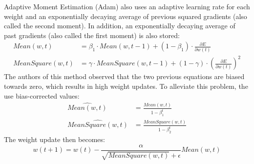 Adaptive Moment Estimation (Adam) \citep{DBLP:journals/corr/KingmaB14} also uses an adaptive learning rate for each weight and an exponentially decaying average of previous squared gradients (also called the second moment). In addition, an exponentially decaying average of past gradients (also called the first moment) is also stored:
\begin{subequations}
\label{eq:adam:means}
\begin{align}
    Mean(w,t) &= \beta_1 \cdot Mean(w,t-1) + (1-\beta_1)\cdot \frac{\partial E}{\partial w(t)}\\
    MeanSquare(w, t) &= \gamma \cdot MeanSquare(w, t-1) + (1 - \gamma) \cdot \left (\frac{\partial E}{\partial w(t)} \right )^2
\end{align}
\end{subequations}
The authors of this method observed that the two previous equations are biased towards zero, which results in high weight updates. To alleviate this problem, the use bias-corrected values:
\begin{subequations}
\label{eq:adam:means:corrected}
\begin{align}
    \widehat{Mean(w,t)} &= \frac{Mean(w,t)}{1-\beta_1^t}\\
    \widehat{MeanSquare(w,t)} &= \frac{MeanSquare(w,t)}{1-\beta_2^t}
\end{align}
\end{subequations}
The weight update then becomes:
\begin{equation}
    w(t+1) = w(t) - \frac{\alpha}{\sqrt{MeanSquare(w,t)} + \epsilon} Mean(w,t)
\end{equation}



